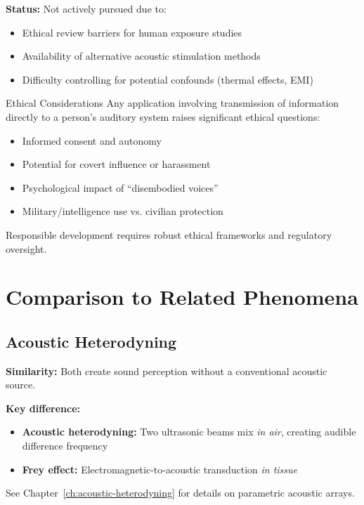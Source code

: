 \textbf{Status:} Not actively pursued due to:
\begin{itemize}
\item Ethical review barriers for human exposure studies
\item Availability of alternative acoustic stimulation methods
\item Difficulty controlling for potential confounds (thermal effects, EMI)
\end{itemize}

\begin{calloutbox}{Ethical Considerations}
Any application involving transmission of information directly to a person's auditory system raises significant ethical questions:
\begin{itemize}
\item Informed consent and autonomy
\item Potential for covert influence or harassment
\item Psychological impact of ``disembodied voices''
\item Military/intelligence use vs. civilian protection
\end{itemize}

Responsible development requires robust ethical frameworks and regulatory oversight.
\end{calloutbox}

\section{Comparison to Related Phenomena}

\subsection{Acoustic Heterodyning}
\label{subsec:frey-vs-heterodyning}

\textbf{Similarity:} Both create sound perception without a conventional acoustic source.

\textbf{Key difference:}
\begin{itemize}
\item \textbf{Acoustic heterodyning:} Two ultrasonic beams mix \emph{in air}, creating audible difference frequency
\item \textbf{Frey effect:} Electromagnetic-to-acoustic transduction \emph{in tissue}
\end{itemize}

See Chapter~\ref{ch:acoustic-heterodyning} for details on parametric acoustic arrays.

